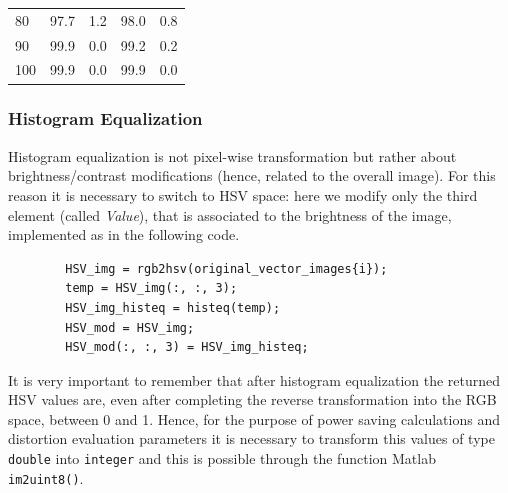 \documentclass[a4paper]{article}
\begin{document}
\begin{center}
\begin{tabular}{@{}lllll@{}}
80                                                & 97.7                                          & 1.2            & 98.0                                           & 0.8            \\
90                                                & 99.9                                          & 0.0            & 99.2                                           & 0.2            \\
100                                               & 99.9                                          & 0.0            & 99.9                                           & 0.0            \\ \bottomrule
\end{tabular}
\end{center}

        \subsubsection{Histogram Equalization}
        Histogram equalization is not pixel-wise transformation but rather about brightness/contrast modifications (hence, related to the overall image). For this reason it is necessary to switch to HSV space: here we modify only the third element (called \emph{Value}), that is associated to the brightness of the image, implemented as in the following code.
        \begin{verbatim}
        HSV_img = rgb2hsv(original_vector_images{i});
        temp = HSV_img(:, :, 3);
        HSV_img_histeq = histeq(temp);
        HSV_mod = HSV_img;
        HSV_mod(:, :, 3) = HSV_img_histeq;
        \end{verbatim}
        It is very important to remember that after histogram equalization the returned HSV values are, even after completing the reverse transformation into the RGB space, between 0 and 1. Hence, for the purpose of power saving calculations and distortion evaluation parameters it is necessary to transform this values of type \texttt{double} into \texttt{integer} and this is possible through the function Matlab \texttt{im2uint8()}.
\end{document}
